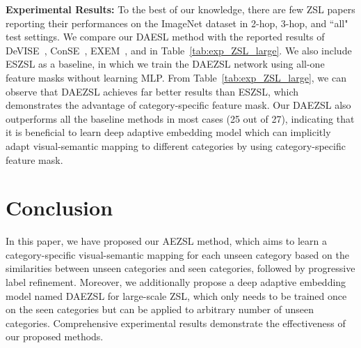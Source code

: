 \documentclass[journal]{IEEEtran}
\begin{document}
\noindent\textbf{Experimental Results:} To the best of our knowledge, there are few ZSL papers \cite{frome2013devise,norouzi2013zero,changpinyo2016synthesized,changpinyo2016predicting} reporting their performances on the ImageNet dataset in 2-hop, 3-hop, and ``all" test settings. We compare our DAESL method with the reported results of DeVISE~\cite{frome2013devise}, ConSE~\cite{norouzi2013zero}, EXEM~\cite{changpinyo2016predicting}, and \cite{changpinyo2016synthesized} in Table~\ref{tab:exp_ZSL_large}. We also include ESZSL as a baseline, in which we train the DAEZSL network using all-one feature masks without learning MLP. From Table~\ref{tab:exp_ZSL_large}, we can observe that DAEZSL achieves far better results than ESZSL, which demonstrates the advantage of category-specific feature mask. Our DAEZSL also outperforms all the baseline methods in most cases (25 out of 27), indicating that it is beneficial to learn deep adaptive embedding model which can implicitly adapt visual-semantic mapping to different categories by using category-specific feature mask. 

\section{Conclusion} \label{sec:conclusion}
In this paper, we have proposed our AEZSL method, which aims to learn a category-specific visual-semantic mapping for each unseen category based on the similarities between unseen categories and seen categories, followed by progressive label refinement. Moreover, we additionally propose a deep adaptive embedding model named DAEZSL for large-scale ZSL, which only needs to be trained once on the seen categories but can be applied to arbitrary number of unseen categories. Comprehensive experimental results demonstrate the effectiveness of our proposed methods.








\end{document}
